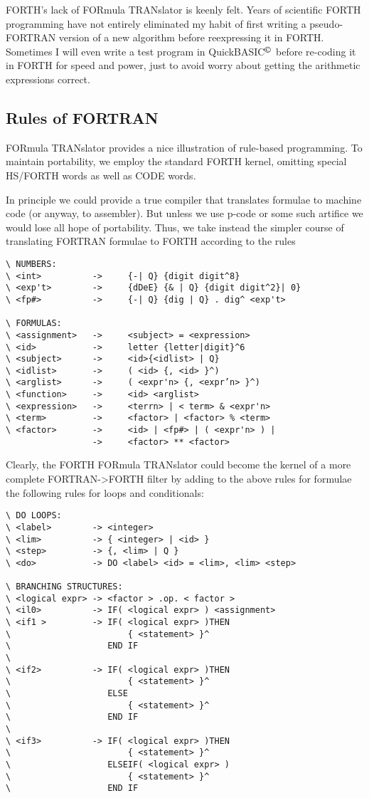 FORTH's lack of FORmula TRANslator is keenly felt. Years of scientific FORTH programming have not entirely eliminated my habit of first writing a pseudo-FORTRAN version of a new algorithm before reexpressing it in FORTH. Sometimes I will even write a test program in QuickBASIC$^{\copyright}$ before re-coding it in FORTH for speed and power, just to avoid worry about getting the arithmetic expressions correct.

\subsection{Rules of FORTRAN}
 FORmula TRANslator provides a nice illustration of rule-based programming. To maintain portability, we employ the standard FORTH kernel, omitting special HS/FORTH words as well as CODE words.

In principle we could provide a true compiler that translates formulae to machine code (or anyway, to assembler). But unless we use p-code or some such artifice we would lose all hope of portability. Thus, we take instead the simpler course of translating FORTRAN formulae to FORTH according to the rules

\begin{verbatim}
\ NUMBERS:
\ <int>          ->     {-| Q} {digit digit^8}
\ <exp't>        ->     {dDeE} {& | Q} {digit digit^2}| 0}
\ <fp#>          ->     {-| Q} {dig | Q} . dig^ <exp't>

\ FORMULAS:
\ <assignment>   ->     <subject> = <expression>
\ <id>           ->     letter {letter|digit}^6
\ <subject>      ->     <id>{<idlist> | Q}
\ <idlist>       ->     ( <id> {, <id> }^)
\ <arglist>      ->     ( <expr'n> {, <expr’n> }^)
\ <function>     ->     <id> <arglist>
\ <expression>   ->     <terrn> | < term> & <expr'n>
\ <term>         ->     <factor> | <factor> % <term>
\ <factor>       ->     <id> | <fp#> | ( <expr'n> ) |
                 ->     <factor> ** <factor>
\end{verbatim}

Clearly, the FORTH FORmula TRANslator could become the kernel of a more complete FORTRAN->FORTH filter by adding to the above rules for formulae the following rules for loops and conditionals:

\begin{verbatim}
\ DO LOOPS:
\ <label>        -> <integer>
\ <lim>          -> { <integer> | <id> }
\ <step>         -> {, <lim> | Q }
\ <do>           -> DO <label> <id> = <lim>, <lim> <step>

\ BRANCHING STRUCTURES:
\ <logical expr> -> <factor > .op. < factor >
\ <il0>          -> IF( <logical expr> ) <assignment>
\ <if1 >         -> IF( <logical expr> )THEN
\                       { <statement> }^
\                   END IF
\
\ <if2>          -> IF( <logical expr> )THEN
\                       { <statement> }^
\                   ELSE
\                       { <statement> }^
\                   END IF
\
\ <if3>          -> IF( <logical expr> )THEN
\                       { <statement> }^
\                   ELSEIF( <logical expr> )
\                       { <statement> }^
\                   END IF
\end{verbatim}

